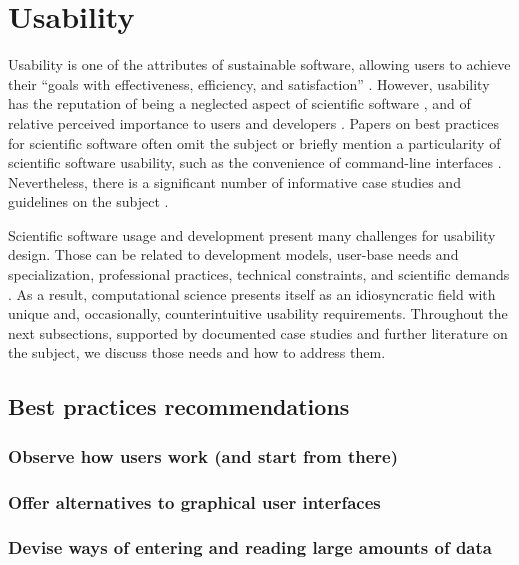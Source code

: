 \section{Usability}
\label{sec:usability}

Usability is one of the attributes of sustainable software, allowing users to achieve their “goals with effectiveness, efficiency, and satisfaction” \cite[p.3]{Venters_WSSSPE}. However, usability has the reputation of being a neglected aspect of scientific software \cite{Ahmed:2014}, and of relative perceived importance to users and developers \cite{Nguyen-Hoan:2010, Hucka:2016}. Papers on best practices for scientific software often omit the subject \cite{Stodden_WSSSPE, Wilson:2016} or briefly mention a particularity of scientific software usability, such as the convenience of command-line interfaces \cite{bestprSC}. Nevertheless, there is a significant number of informative case studies and guidelines on the subject \cite{Springmeyer:1993, Pancake:1996, Javahery:2004, Schraefel:2004,Letondal:2004, Talbott:2005, Macaulay:2009, Keefe:2010, DeMatos:2013, Ahmed:2014}.

Scientific software usage and development present many challenges for usability design. Those can be related to development models, user-base needs and specialization, professional practices, technical constraints, and scientific demands \cite{Queiroz:2016}. As a result, computational science presents itself as an idiosyncratic field with unique and, occasionally, counterintuitive usability requirements. Throughout the next subsections, supported by documented case studies and further literature on the subject, we discuss those needs and how to address them. 

\subsection{Best practices recommendations}

\subsubsection{Observe how users work (and start from there)}

\subsubsection{Offer alternatives to graphical user interfaces}

\subsubsection{Devise ways of entering and reading large amounts of data}

